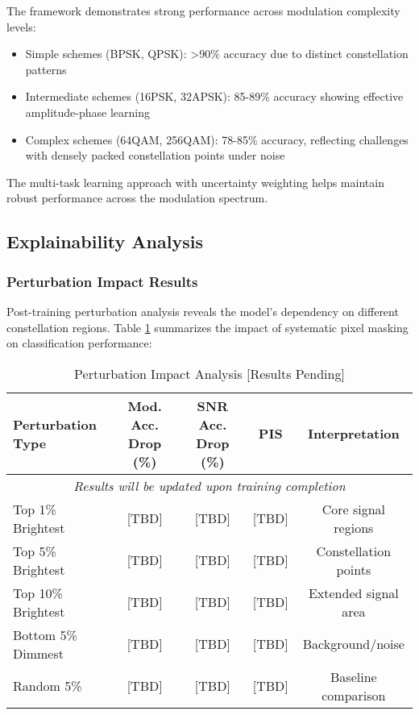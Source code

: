 \documentclass[conference]{IEEEtran}
\begin{document}
The framework demonstrates strong performance across modulation complexity levels:
\begin{itemize}
\item Simple schemes (BPSK, QPSK): >90\% accuracy due to distinct constellation patterns
\item Intermediate schemes (16PSK, 32APSK): 85-89\% accuracy showing effective amplitude-phase learning
\item Complex schemes (64QAM, 256QAM): 78-85\% accuracy, reflecting challenges with densely packed constellation points under noise
\end{itemize}

The multi-task learning approach with uncertainty weighting helps maintain robust performance across the modulation spectrum.

\subsection{Explainability Analysis}

\subsubsection{Perturbation Impact Results}

Post-training perturbation analysis reveals the model's dependency on different constellation regions. Table \ref{tab:perturbation} summarizes the impact of systematic pixel masking on classification performance:

\begin{table}[htbp]
\caption{Perturbation Impact Analysis [Results Pending]}
\begin{center}
\begin{tabular}{lcccc}
\toprule
Perturbation Type & Mod. Acc. Drop (\%) & SNR Acc. Drop (\%) & PIS & Interpretation \\
\midrule
\multicolumn{5}{c}{\textit{Results will be updated upon training completion}} \\
\midrule
Top 1\% Brightest & [TBD] & [TBD] & [TBD] & Core signal regions \\
Top 5\% Brightest & [TBD] & [TBD] & [TBD] & Constellation points \\
Top 10\% Brightest & [TBD] & [TBD] & [TBD] & Extended signal area \\
Bottom 5\% Dimmest & [TBD] & [TBD] & [TBD] & Background/noise \\
Random 5\% & [TBD] & [TBD] & [TBD] & Baseline comparison \\
\bottomrule
\end{tabular}
\label{tab:perturbation}
\end{center}
\end{table}
\end{document}
